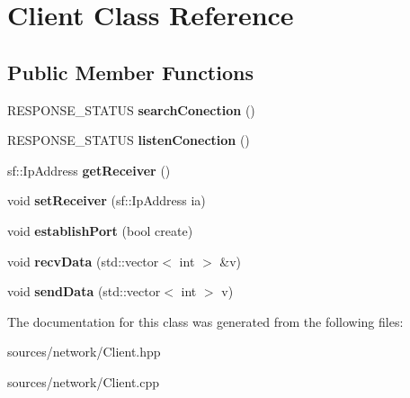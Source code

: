 \hypertarget{classClient}{}\section{Client Class Reference}
\label{classClient}
\subsection*{Public Member Functions}
\begin{DoxyCompactItemize}
\item 
\mbox{\label{classClient_a9dacbc3677315e923e8c50e50db6725e}} 
R\+E\+S\+P\+O\+N\+S\+E\+\_\+\+S\+T\+A\+T\+US {\bfseries search\+Conection} ()
\item 
\mbox{\label{classClient_a0ad050c35231e71ded2ffdd83a2a1ea7}} 
R\+E\+S\+P\+O\+N\+S\+E\+\_\+\+S\+T\+A\+T\+US {\bfseries listen\+Conection} ()
\item 
\mbox{\label{classClient_aa675dea94e1a5b19e37bd19d35a99620}} 
sf\+::\+Ip\+Address {\bfseries get\+Receiver} ()
\item 
\mbox{\label{classClient_a5ea44065fefaa5d96709fb59082a0fcd}} 
void {\bfseries set\+Receiver} (sf\+::\+Ip\+Address ia)
\item 
\mbox{\label{classClient_a65d2e1dcab3412f1df6b30f97265f909}} 
void {\bfseries establish\+Port} (bool create)
\item 
\mbox{\label{classClient_ace8e511813b9b461570bc0bf5b9a2307}} 
void {\bfseries recv\+Data} (std\+::vector$<$ int $>$ \&v)
\item 
\mbox{\label{classClient_a52dd5c67c4a0f52f62706eb2a96bfa0d}} 
void {\bfseries send\+Data} (std\+::vector$<$ int $>$ v)
\end{DoxyCompactItemize}


The documentation for this class was generated from the following files\+:\begin{DoxyCompactItemize}
\item 
sources/network/Client.\+hpp\item 
sources/network/Client.\+cpp\end{DoxyCompactItemize}
